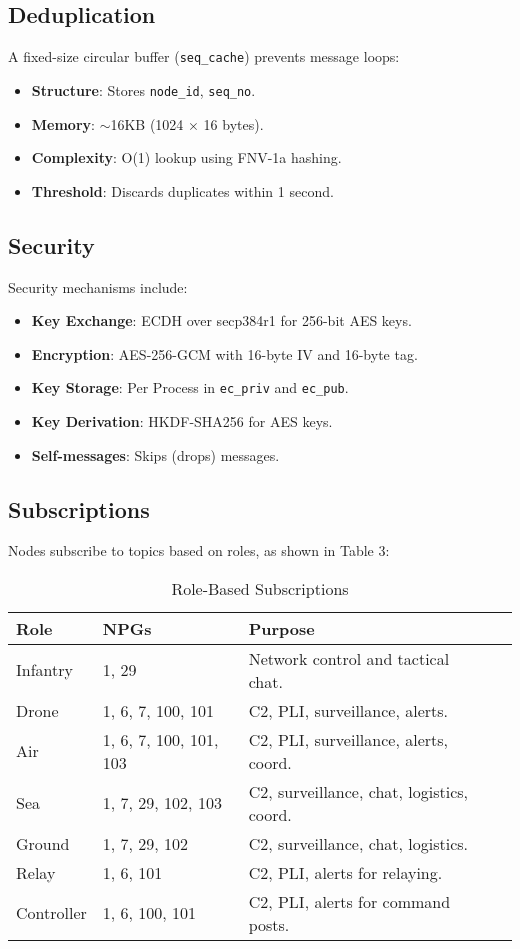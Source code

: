 \documentclass{article}
\begin{document}
\subsection{Deduplication}
A fixed-size circular buffer (\texttt{seq\_cache}) prevents message loops:
\begin{itemize}
    \item \textbf{Structure}: Stores \texttt{node\_id}, \texttt{seq\_no}.
    \item \textbf{Memory}: $\sim$16KB (1024 $\times$ 16 bytes).
    \item \textbf{Complexity}: O(1) lookup using FNV-1a hashing.
    \item \textbf{Threshold}: Discards duplicates within 1 second.
\end{itemize}

\subsection{Security}
Security mechanisms include:
\begin{itemize}
    \item \textbf{Key Exchange}: ECDH over secp384r1 for 256-bit AES keys.
    \item \textbf{Encryption}: AES-256-GCM with 16-byte IV and 16-byte tag.
    \item \textbf{Key Storage}: Per Process in \texttt{ec\_priv} and \texttt{ec\_pub}.
    \item \textbf{Key Derivation}: HKDF-SHA256 for AES keys.
    \item \textbf{Self-messages}: Skips (drops)  messages.
\end{itemize}

\newpage
\subsection{Subscriptions}
Nodes subscribe to topics based on roles, as shown in Table 3:
\begin{table}[h]
\centering
\caption{Role-Based Subscriptions}
\begin{tabular}{lllp{5cm}}
\hline
\textbf{Role} & \textbf{NPGs} & \textbf{Purpose} \\
\hline
Infantry   & 1, 29                  & Network control and tactical chat. \\
Drone      & 1, 6, 7, 100, 101      & C2, PLI, surveillance, alerts. \\
Air        & 1, 6, 7, 100, 101, 103 & C2, PLI, surveillance, alerts, coord. \\
Sea        & 1, 7, 29, 102, 103     & C2, surveillance, chat, logistics, coord. \\
Ground     & 1, 7, 29, 102          & C2, surveillance, chat, logistics. \\
Relay      & 1, 6, 101              & C2, PLI, alerts for relaying. \\
Controller & 1, 6, 100, 101         & C2, PLI, alerts for command posts. \\
\hline
\end{tabular}
\end{table}
\end{document}
